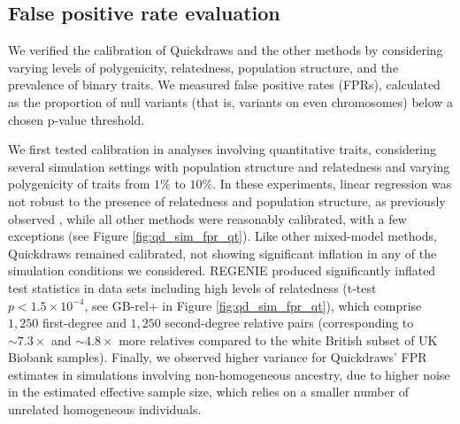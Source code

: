 \subsection{False positive rate evaluation}
We verified the calibration of Quickdraws and the other methods by considering varying levels of polygenicity, relatedness, population structure, and the prevalence of binary traits.
%
We measured false positive rates (FPRs), calculated as the proportion of null variants (that is, variants on even chromosomes) below a chosen p-value threshold. 
%

%
We first tested calibration in analyses involving quantitative traits, considering several simulation settings with population structure and relatedness and varying polygenicity of traits from $1\%$ to $10\%$.
%
In these experiments, linear regression was not robust to the presence of relatedness and population structure, as previously observed \cite{yang2014advantages,loh2015efficient,jiang2019resource}, while all other methods were reasonably calibrated, with a few exceptions (see Figure \ref{fig:qd_sim_fpr_qt}).
%
Like other mixed-model methods, Quickdraws remained calibrated, not showing significant inflation in any of the simulation conditions we considered.
%
REGENIE produced significantly inflated test statistics in data sets including high levels of relatedness (t-test $p < 1.5 \times 10^{-4}$, see GB-rel+ in Figure \ref{fig:qd_sim_fpr_qt}), which comprise $1{,}250$ first-degree and $1{,}250$ second-degree relative pairs (corresponding to ${\sim}7.3 \times$ and ${\sim}4.8 \times$ more relatives compared to the white British subset of UK Biobank samples).
%
Finally, we observed higher variance for Quickdraws' FPR estimates in simulations involving non-homogeneous ancestry, due to higher noise in the estimated effective sample size, which relies on a smaller number of unrelated homogeneous individuals.

